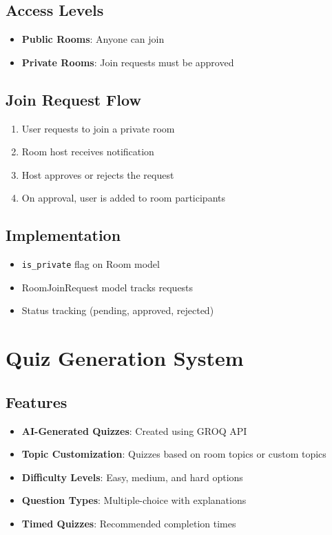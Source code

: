 \documentclass[11pt]{article}
\begin{document}
\subsection{Access Levels}
\begin{itemize}
  \item \textbf{Public Rooms}: Anyone can join
  \item \textbf{Private Rooms}: Join requests must be approved
\end{itemize}

\subsection{Join Request Flow}
\begin{enumerate}
  \item User requests to join a private room
  \item Room host receives notification
  \item Host approves or rejects the request
  \item On approval, user is added to room participants
\end{enumerate}

\subsection{Implementation}
\begin{itemize}
  \item \texttt{is\_private} flag on Room model
  \item RoomJoinRequest model tracks requests
  \item Status tracking (pending, approved, rejected)
\end{itemize}

\section{Quiz Generation System}

\subsection{Features}
\begin{itemize}
  \item \textbf{AI-Generated Quizzes}: Created using GROQ API
  \item \textbf{Topic Customization}: Quizzes based on room topics or custom topics
  \item \textbf{Difficulty Levels}: Easy, medium, and hard options
  \item \textbf{Question Types}: Multiple-choice with explanations
  \item \textbf{Timed Quizzes}: Recommended completion times
\end{itemize}
\end{document}
